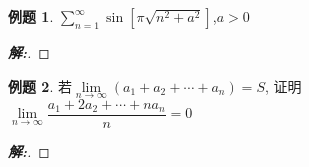 \documentclass[12pt,a4paper]{ctexart}
\newenvironment{solution}{\begin{proof}[\hspace{2em}\textbf{解:}]}{\end{proof}}
\theoremstyle{definition}%
\newtheorem{exercise}{\hspace{2em}例题}
\begin{document}
\begin{exercise}
	$ \displaystyle\sum_{n=1}^{\infty} \sin[\pi\sqrt{n^2+a^2}] $,$ a>0 $
\end{exercise}
\begin{solution}
	
\end{solution}

\begin{exercise}
	若$ \lim\limits_{n \to \infty}(a_1+a_2+\cdots+a_n)=S $, 证明\\
	
	$ \lim\limits_{n \to \infty}\dfrac{a_1+2a_2+\cdots+na_n}{n}=0 $
\end{exercise}
\begin{solution}
	
\end{solution}
\end{document}
